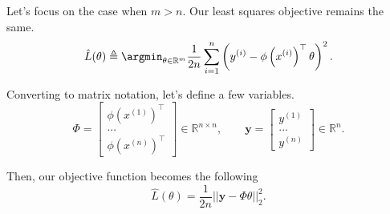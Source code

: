 \noindent Let's focus on the case when $m > n$. Our least squares objective remains the same.
$$
\hat{L}(\theta) \triangleq \argmin_{\theta \in \mathbb{R}^m} \frac{1}{2n} \sum_{i=1}^n \left( y^{(i)} - \phi \left (x^{(i)} \right)^\top \theta \right)^2.
$$

\noindent Converting to matrix notation, let's define a few variables.
$$
\Phi = \begin{bmatrix} \phi(x^{(1)})^\top \\ ... \\ \phi(x^{(n)})^\top \end{bmatrix} \in \mathbb{R}^{n \times n}, \qquad \bm{y} = \begin{bmatrix} y^{(1)} \\ ... \\ y^{(n)} \end{bmatrix} \in \mathbb{R}^n.
$$

\noindent Then, our objective function becomes the following
$$
\hat{L}(\theta) = \frac{1}{2n}||\bm{y} - \Phi\theta||_2^2.
$$

